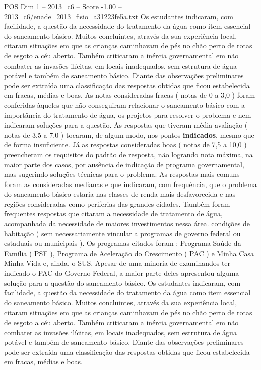 \begin{textsample}{POS Dim 1 – 2013\_c6 – Score -1.00 – 2013\_c6/enade\_2013\_fisio\_a31223fe5a.txt}
Os estudantes indicaram, com facilidade, a questão da necessidade do tratamento da água como item essencial do saneamento básico.
Muitos concluintes, através da sua experiência local, citaram situações em que as crianças caminhavam de pés no chão perto de rotas de esgoto a céu aberto.
Também criticaram a inércia governamental em não combater as invasões ilícitas, em locais inadequados, sem estrutura de água potável e também de saneamento básico.
Diante das observações preliminares pode ser extraída uma classificação das respostas obtidas que ficou estabelecida em fracas, médias e boas.
As notas consideradas fracas ( notas de 0 a 3,0 ) foram conferidas àqueles que não conseguiram relacionar o saneamento básico com a importância do tratamento de água, os projetos para resolver o problema e nem indicaram soluções para a questão.
As respostas que tiveram média avaliação ( notas de 3,5 a 7,0 ) tocaram, de algum modo, nos pontos \textbf{indicados}, mesmo que de forma insuficiente.
Já as respostas consideradas boas ( notas de 7,5 a 10,0 ) preencheram os requisitos do padrão de resposta, não logrando nota máxima, na maior parte dos casos, por ausência de indicação de programa governamental, mas sugerindo soluções técnicas para o problema.
As respostas mais comuns foram as consideradas medianas e que indicaram, com frequência, que o problema do saneamento básico estaria nas classes de renda mais desfavorecida e nas regiões consideradas como periferias das grandes cidades.
Também foram frequentes respostas que citaram a necessidade de tratamento de água, acompanhada da necessidade de maiores investimentos nessa área. condições de habitação ( sem necessariamente vincular a programas de governo federal ou estaduais ou municipais ).
Os programas citados foram : Programa Saúde da Família ( PSF ), Programa de Aceleração do Crescimento ( PAC ) e Minha Casa Minha Vida e, ainda, o SUS.
Apesar de uma minoria de examinandos ter indicado o PAC do Governo Federal, a maior parte deles apresentou alguma solução para a questão do saneamento básico.
Os estudantes indicaram, com facilidade, a questão da necessidade do tratamento da água como item essencial do saneamento básico.
Muitos concluintes, através da sua experiência local, citaram situações em que as crianças caminhavam de pés no chão perto de rotas de esgoto a céu aberto.
Também criticaram a inércia governamental em não combater as invasões ilícitas, em locais inadequados, sem estrutura de água potável e também de saneamento básico.
Diante das observações preliminares pode ser extraída uma classificação das respostas obtidas que ficou estabelecida em fracas, médias e boas.

\end{textsample}
